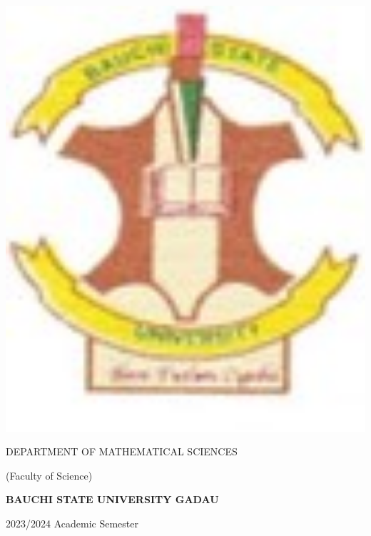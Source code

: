 \documentclass[12pt, a4paper]{exam}
\begin{document}
	\noindent
	\begin{minipage}[l]{0.1\textwidth}
		\noindent
		\includegraphics[width=1.4\textwidth]{gadau}
	\end{minipage}
\hfill
\begin{minipage}[c]{0.8\textwidth}
	\begin{center}
		{\large DEPARTMENT OF MATHEMATICAL SCIENCES \par
		\large	(Faculty of Science)	\par
	\large \textbf{BAUCHI STATE UNIVERSITY GADAU}	\par
\small	2023/2024 Academic Semester}
	\end{center}
\end{minipage}%
\end{document}
